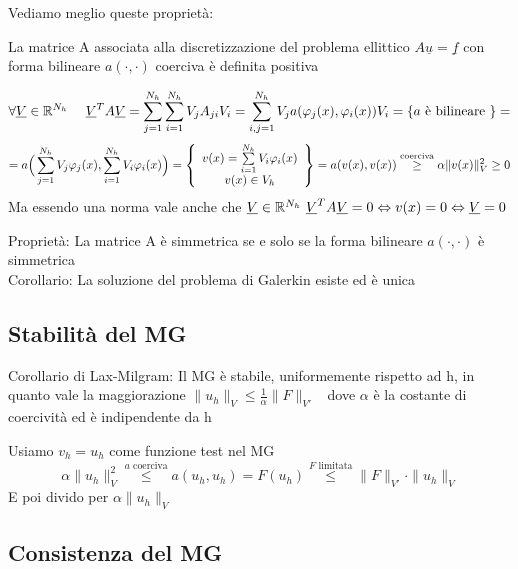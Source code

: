 \documentclass{article}
\renewcommand{\vv}[1]{\underline{#1}}
\begin{document}
Vediamo meglio queste proprietà:\\



\begin{teo}
La matrice A associata alla discretizzazione del problema ellittico $A\vv{u}=\vv{f}$ con forma bilineare $a(\cdot,\cdot)$ coerciva è definita positiva
\end{teo}

\begin{Dim}
\[
\forall \vv{V}\in \R^{N_h} \ \ \ \ \vv{V}^TA\vv{V} = \Sum{j=1}{N_h} \Sum{i=1}{N_h} V_j A_{ji} V_i = \Sum{i,j=1}{N_h} V_j a(\phi_j(x),\phi_i(x))V_i = \{a \text{ è bilineare }\} =\]
\[ = a\Big( \sum\limits_{j=1}^{N_h} V_j\varphi_j(x), \sum\limits_{i=1}^{N_h} V_i \varphi_i(x) \Big) = \left\{ \begin{array}{c}
     v(x)= \sum\limits_{i=1}^{N_h} V_i\varphi_i(x) \\
     v(x)\in V_h
\end{array} \right\} = a(v(x),v(x)) \overset{\text{coerciva}}{\ \ge \ }
\alpha \|v(x)\|_V^2 \ge 0
\]
Ma essendo una norma vale anche che $\vv{V}\in \R^{N_h} \ \vv{V}^TA\vv{V}=0 \Leftrightarrow v(x)=0 \Leftrightarrow \vv{V}=0$\\
\end{Dim}

Proprietà: La matrice A è simmetrica se e solo se la forma bilineare $a(\cdot,\cdot)$ è simmetrica\\
Corollario: La soluzione del problema di Galerkin esiste ed è unica\\

\subsection{Stabilità del MG}

Corollario di Lax-Milgram: Il MG è stabile, uniformemente rispetto ad h, in quanto vale la maggiorazione $\|u_h\|_V\le \frac{1}{\alpha} \|F\|_{V'}$ \ dove $\alpha$ è la costante di coercività ed è indipendente da h

\begin{Dim}
    Usiamo $v_h=u_h$ come funzione test nel MG
    \[ 
    \alpha \|u_h\|_V^2 \overset{a \text{ coerciva}}{\ \le \ } a(u_h,u_h) = F(u_h) \overset{F \text{ limitata}}{\ \le \ } \|F\|_{V'}\cdot \|u_h\|_V
    \]
    E poi divido per $\alpha\|u_h\|_V$
\end{Dim}
\phantom{}

\subsection{Consistenza del MG}
\end{document}

